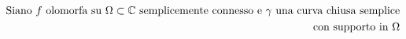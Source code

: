 \documentclass[preview]{standalone}
\begin{document}
\begin{align*}
\special{dvisvgm:raw <g id='unique000'>}\text{Siano } f \text{ olomorfa su } \Omega \subset \mathbb{C} \text{ semplicemente connesso e } \gamma \text{ una curva chiusa semplice} \\ \text{con supporto in } \Omega\special{dvisvgm:raw </g>}
\end{align*}
\end{document}
